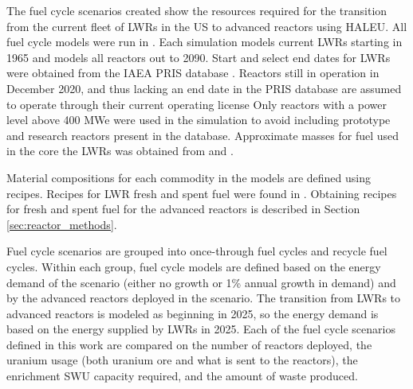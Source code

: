 The fuel cycle scenarios created show the resources required for the transition from the 
current fleet of \glspl{LWR} in the US to advanced reactors using \gls{HALEU}.
All fuel cycle models were run in \Cyclus 
\cite{huff_fundamental_2016}. Each simulation models current 
\glspl{LWR} starting in 1965 and models all reactors out to 2090. Start 
and select end dates for \glspl{LWR} were obtained from the \gls{IAEA} \gls{PRIS} database 
\cite{noauthor_power_1989}. Reactors still in operation in December 2020, and thus 
lacking an end date in the \gls{PRIS} database are assumed to operate through their 
current operating license 
\cite{us_nuclear_regulatory_commission_clinton_2021,us_nuclear_regulatory_commission_comanche_2021,us_nuclear_regulatory_commission_comanche_2021-1,us_nuclear_regulatory_commission_perry_2021,us_nuclear_regulatory_commission_watts_2021,us_nuclear_regulatory_commission_watts_2021-1,nuclear_energy_institute_initial_2021,nuclear_energy_institute_second_2021}
Only reactors with a power level above 400 MWe were used in the simulation 
to avoid including prototype and research reactors present in the database. 
Approximate masses for fuel used in the core the \glspl{LWR} was obtained 
from \cite{todreas_nuclear_2012} and \cite{cacuci_handbook_2010}. 

Material compositions for each commodity in the models are defined using recipes.
Recipes for \gls{LWR} fresh and spent fuel were found in \cite{yacout_visionverifiable_2006}.
Obtaining recipes for fresh and spent fuel for the advanced reactors is described in 
Section \ref{sec:reactor_methods}.

Fuel cycle scenarios are grouped into once-through fuel cycles and recycle fuel 
cycles. Within each group, fuel cycle models are defined based on the energy demand 
of the scenario (either no growth or 1\% annual growth in demand) and by the 
advanced reactors deployed in the scenario. The transition from \glspl{LWR} to 
advanced reactors is modeled as beginning in 2025, so the energy demand is based on the 
energy supplied by \glspl{LWR} in 2025. Each of the fuel cycle scenarios 
defined in this work are compared on the number of reactors deployed, the 
uranium usage (both uranium ore and what is sent to the reactors), the enrichment 
\gls{SWU} capacity required, and the amount of waste produced. 

